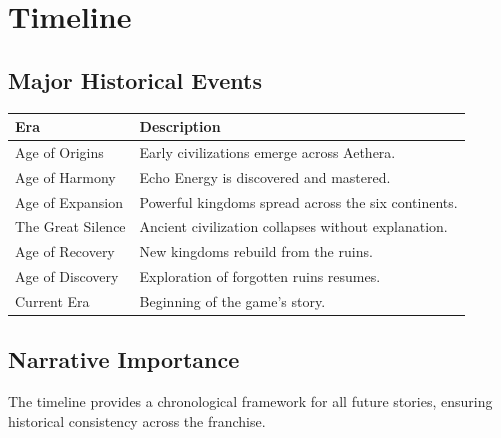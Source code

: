 \chapter{Timeline}

\section{Major Historical Events}

\begin{longtable}{|p{4cm}|p{10cm}|}
\hline
\textbf{Era} & \textbf{Description} \\
\hline
Age of Origins & Early civilizations emerge across Aethera. \\
\hline
Age of Harmony & Echo Energy is discovered and mastered. \\
\hline
Age of Expansion & Powerful kingdoms spread across the six continents. \\
\hline
The Great Silence & Ancient civilization collapses without explanation. \\
\hline
Age of Recovery & New kingdoms rebuild from the ruins. \\
\hline
Age of Discovery & Exploration of forgotten ruins resumes. \\
\hline
Current Era & Beginning of the game's story. \\
\hline
\end{longtable}

\section{Narrative Importance}

The timeline provides a chronological framework for all future stories, ensuring historical consistency across the franchise.
